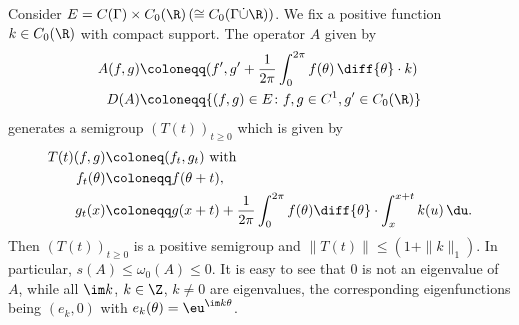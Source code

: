 \begin{example}\label{ex:b3-2.13}
	Consider $E = C(\Gamma) \times C_{0}(\R) \, (\cong C_{0}(\Gamma\dot{\cup}\R))$.
	We fix a positive function $k \in C_{0}(\R)$ with compact support.
	The operator $A$ given by
	\begin{equation}\label{eq:b3-2.20}
		\begin{aligned}
		A(f,g) &\coloneqq (f',g' + \frac{1}{2\pi}\int_{0}^{2\pi} f(\theta) \, \diff{\theta}\cdot k) \\
		D(A) &\coloneqq \{(f,g) \in E \colon f,g \in C^{1}, g' \in C_{0}(\R)\}
		\end{aligned}
	\end{equation}
	generates a semigroup $(T(t))_{t \geq 0}$ which is given by
	\begin{equation}\label{eq:b3-2.21}
		\begin{aligned}
			T(t)(f,g) &\coloneq (f_{t},g_{t}) \text{ with }\\
		   f_{t}(\theta) &\coloneqq f(\theta+t), \\
			g_{t}(x) &\coloneqq g(x+t) + \frac{1}{2\pi}\int_{0}^{2\pi} f(\theta) \diff{\theta}\cdot\int_{x}^{x+t} k(u) \, \du .
		\end{aligned} 
	\end{equation}
	Then $(T(t))_{t \geq 0}$ is a positive semigroup and $\|T(t)\| \leq (1 + \|k\|_{1})$.
	In particular, $s(A) \leq \omega_{0}(A) \leq 0$.
	It is easy to see that $0$ is not an eigenvalue of\/ $A$, while all $\im k$, $k \in \Z$, $k \neq 0$ are eigenvalues, the corresponding eigenfunctions being $(e_{k},0)$ with $e_{k}(\theta) = \eu^{\im k\theta}$.
\end{example}
